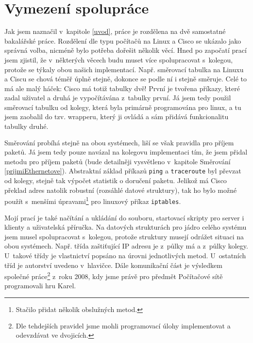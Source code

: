 \section{Vymezení spolupráce} \label{vymezeni}
Jak jsem naznačil v~kapitole \ref{uvod}, práce je rozdělena na dvě samostatné bakalářské práce. Rozdělení dle typu počítačů na Linux a Cisco se ukázalo jako správná volba, nicméně bylo potřeba dořešit několik věcí. Hned po započatí prací jsem zjistil, že v~některých věcech budu muset více spolupracovat s~kolegou, protože se týkaly obou našich implementací. Např. směrovací tabulka na Linuxu a Ciscu se chová téměř úplně stejně, dokonce se podle ní i stejně směruje. Celé to má ale malý háček: Cisco má totiž tabulky dvě! První je tvořena příkazy, které zadal uživatel a druhá je vypočítávána z~tabulky první. Já jsem tedy použil směrovací tabulku od kolegy, která byla primárně programována pro linux, a tu jsem zaobalil do tzv. wrapperu, který ji ovládá a sám přidává funkcionalitu tabulky druhé. 

Směrování probíhá stejně na obou systémech, liší se však pravidla pro příjem paketů. Já jsem tedy pouze navázal na kolegovu implementaci tím, že jsem přidal metodu pro příjem paketů (bude detailněji vysvětleno v~kapitole Směrování \ref{prijmiEthernetove}). Abstraktní základ příkazů \verb|ping| a \verb|traceroute| byl převzat od kolegy, stejně tak výpočet statistik o doručení paketu. Jelikož má Cisco překlad adres natolik robustní (rozsáhlé datové struktury), tak ho bylo možné použít s~menšími úpravami\footnote{Stačilo přidat několik obslužných metod.} pro linuxový příkaz \verb|iptables|. 

Mojí prací je také načítání a ukládání do souboru, startovací skripty pro server i klienty a uživatelská příručka. Na datových strukturách pro jádro celého systému jsem musel spolupracovat s~kolegou, protože struktury musejí odrážet situaci na obou systémech. Např. třída zaštiťující IP adresu je z~půlky má a z~půlky kolegy. U~takové třídy je vlastnictví popsáno na úrovni jednotlivých metod. U~ostatních tříd je autorství uvedeno v~hlavičce. Dále komunikační část je výsledkem společné práce\footnote{Dle tehdejších pravidel jsme mohli programovací úlohy implementovat a odevzdávat ve dvojicích.} z~roku 2008, kdy jsme právě pro předmět Počítačové sítě programovali hru Karel.




